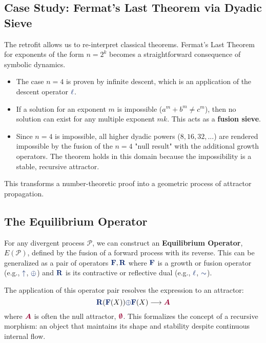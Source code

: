 \subsection{Case Study: Fermat's Last Theorem via Dyadic Sieve}
The retrofit allows us to re-interpret classical theorems. Fermat's Last Theorem for exponents of the form $n=2^k$ becomes a straightforward consequence of symbolic dynamics.
\begin{itemize}
    \item The case $n=4$ is proven by infinite descent, which is an application of the descent operator $\lha$.
    \item If a solution for an exponent $m$ is impossible ($a^m+b^m \neq c^m$), then no solution can exist for any multiple exponent $mk$. This acts as a \textbf{fusion sieve}.
    \item Since $n=4$ is impossible, all higher dyadic powers ($8, 16, 32, ...$) are rendered impossible by the fusion of the $n=4$ "null result" with the additional growth operators. The theorem holds in this domain because the impossibility is a stable, recursive attractor.
\end{itemize}
This transforms a number-theoretic proof into a geometric process of attractor propagation.

\subsection{The Equilibrium Operator}
For any divergent process $\mathcal{P}$, we can construct an \textbf{Equilibrium Operator}, $E(\mathcal{P})$, defined by the fusion of a forward process with its reverse. This can be generalized as a pair of operators
$\op{F}, \op{R}$ where $\op{F}$ is a growth or fusion operator (e.g., $\grow$, $\fuse$) and $\op{R}$ is its contractive or reflective dual (e.g., $\lha$, $\reflec$).

The application of this operator pair resolves the expression to an attractor:
\[ \op{R}(\op{F}(X)) \fuse \op{F}(X) \longrightarrow \att{A} \]
where $\att{A}$ is often the null attractor, $\void$. This formalizes the concept of a recursive morphism: an object that maintains its shape and stability despite continuous internal flow.


